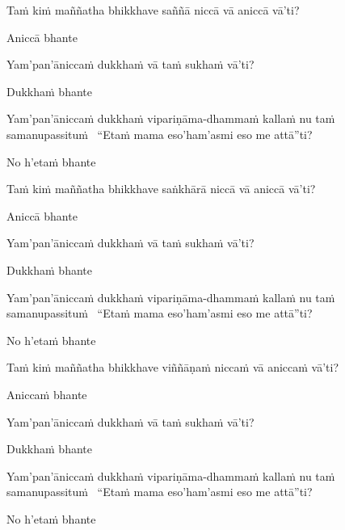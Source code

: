 \begin{pali-hang}
  Taṁ kiṁ maññatha bhikkhave saññā niccā vā aniccā vā'ti?
\end{pali-hang}
\begin{pali-hang-together}
  Aniccā bhante
\end{pali-hang-together}
\begin{pali-hang-together}
  Yam'pan'āniccaṁ dukkhaṁ vā taṁ sukhaṁ vā'ti?
\end{pali-hang-together}
\begin{pali-hang-together}
  Dukkhaṁ bhante
\end{pali-hang-together}
\ifninebythirteenversion\clearpage\fi
\begin{pali-hang-together}
  Yam'pan'āniccaṁ dukkhaṁ vipariṇāma-dhammaṁ kallaṁ nu taṁ samanupassituṁ \breathmark\ ``Etaṁ mama eso'ham'asmi eso me attā''ti?
\end{pali-hang-together}
\begin{pali-hang-together}
  No h'etaṁ bhante
\end{pali-hang-together}

\begin{pali-hang}
  Taṁ kiṁ maññatha bhikkhave saṅkhārā niccā vā aniccā vā'ti?
\end{pali-hang}
\begin{pali-hang-together}
  Aniccā bhante
\end{pali-hang-together}
\begin{pali-hang-together}
  Yam'pan'āniccaṁ dukkhaṁ vā taṁ sukhaṁ vā'ti?
\end{pali-hang-together}
\begin{pali-hang-together}
  Dukkhaṁ bhante
\end{pali-hang-together}
\begin{pali-hang-together}
  Yam'pan'āniccaṁ dukkhaṁ vipariṇāma-dhammaṁ kallaṁ nu taṁ samanupassituṁ \breathmark\ ``Etaṁ mama eso'ham'asmi eso me attā''ti?
\end{pali-hang-together}
\begin{pali-hang-together}
  No h'etaṁ bhante
\end{pali-hang-together}

\begin{pali-hang}
  Taṁ kiṁ maññatha bhikkhave viññāṇaṁ niccaṁ vā aniccaṁ vā'ti?
\end{pali-hang}
\begin{pali-hang-together}
  Aniccaṁ bhante
\end{pali-hang-together}
\begin{pali-hang-together}
  Yam'pan'āniccaṁ dukkhaṁ vā taṁ sukhaṁ vā'ti?
\end{pali-hang-together}
\begin{pali-hang-together}
  Dukkhaṁ bhante
\end{pali-hang-together}
\begin{pali-hang-together}
  Yam'pan'āniccaṁ dukkhaṁ vipariṇāma-dhammaṁ kallaṁ nu taṁ samanupassituṁ \breathmark\ ``Etaṁ mama eso'ham'asmi eso me attā''ti?
\end{pali-hang-together}
\begin{pali-hang-together}
  No h'etaṁ bhante
\end{pali-hang-together}

